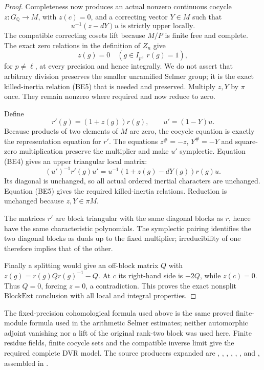 \begin{proof}
Completeness now produces an actual nonzero continuous
cocycle \(z:G_{\mathbb Q}\to M\), with \(z(c)=0\), and
a correcting vector \(Y\in M\) such that
\[
                  u^{-1}(z-dY)u
                           \text{ is strictly upper locally}. \tag{BE4}
\]
The compatible correcting cosets lift because \(M/P\) is
finite free and complete.
The exact zero relations in the definition of \(Z_n\) give
\[
                 z(g)=0\quad(g\in I_p,\ r(g)=1),          \tag{BE5}
\]
for \(p\ne\ell\), at every precision and hence integrally.
We do not assert that arbitrary division preserves the
smaller unramified Selmer group; it is the exact
killed-inertia relation (BE5) that is needed and preserved.
Multiply \(z,Y\) by \(\pi\) once. They remain nonzero where
required and now reduce to zero.

Define
\[
                         r'(g)=(1+z(g))r(g),\qquad
                         u'=(1-Y)u .
\]
Because products of two elements of \(M\) are zero, the
cocycle equation is exactly the representation equation
for \(r'\).
The equations \(z^\#=-z\), \(Y^\#=-Y\) and square-zero
multiplication preserve the multiplier and make \(u'\)
symplectic.
Equation (BE4) gives an upper triangular local matrix:
\[
 (u')^{-1}r'(g)u'
    =u^{-1}(1+z(g)-dY(g))r(g)u .
\]
Its diagonal is unchanged, so all actual ordered inertial
characters are unchanged.
Equation (BE5) gives the required killed-inertia relations.
Reduction is unchanged because \(z,Y\in\pi M\).

The matrices \(r'\) are block triangular with the same
diagonal blocks as \(r\), hence have the same characteristic
polynomials.
The symplectic pairing identifies the two diagonal blocks
as duals up to the fixed multiplier; irreducibility of one
therefore implies that of the other.

Finally a splitting would give an off-block matrix \(Q\)
with \(z(g)=r(g)Qr(g)^{-1}-Q\).
At \(c\) its right-hand side is \(-2Q\), while \(z(c)=0\).
Thus \(Q=0\), forcing \(z=0\), a contradiction.
This proves the exact nonsplit \(\mathrm{BlockExt}\)
conclusion with all local and integral properties.
\end{proof}

The fixed-precision cohomological formula used above is
the same proved finite-module formula used in the arithmetic
Selmer estimates; neither automorphic adjoint vanishing
nor a lift of the original rank-two block was used here.
Finite residue fields, finite cocycle sets and the compatible
inverse limit give the required complete DVR model.
The source producers expanded are
, ,
, , ,
, and , assembled in
.
